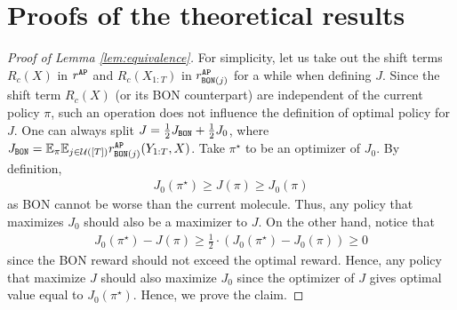 \section{Proofs of the theoretical results}\label{app:theory_proof}
\begin{proof}[Proof of Lemma \ref{lem:equivalence}]\label{app:lem:equivalence}
    For simplicity, let us take out the shift terms $R_c(X)$ in $r^{\mathtt{AP}}$ and $R_c(X_{1:T})$ in $r^{\mathtt{AP}}_{{\mathtt{BON}}(j)}$ for a while when defining $J$. 
    Since the shift term $R_c(X)$ (or its BON counterpart) are  independent of the current policy $\pi$, such an operation does not influence the definition of optimal policy for $J$.
    One can always split $J=\frac 1 2 J_{{\mathtt{BON}}} + \frac 1 2 J_0$, where 
    $J_{{\mathtt{BON}}} = \mathbb{E}_\pi \mathbb{E}_{j\in \mathcal{U}([T])} r_{{\mathtt{BON}}(j)}^{\mathtt{AP}}(Y_{1:T}, X)$. 
    Take $\pi^\star$ to be an optimizer of $J_0$. By definition, 
    \begin{align*}
        J_0(\pi^\star) \ge J(\pi) \ge J_0(\pi)
    \end{align*}
    as BON cannot be worse than the current molecule. 
    Thus, any policy that maximizes $J_0$ should also be a maximizer to $J$. 
    On the other hand, notice that 
    \begin{align}
        J_0(\pi^\star) - J(\pi) \ge \frac 1 2 \cdot (J_0(\pi^\star) - J_0(\pi)) \ge 0
    \end{align}
    since the BON reward should not exceed the optimal reward.
    Hence, any policy that maximize $J$ should also maximize $J_0$ since the optimizer of $J$ gives optimal value equal to $J_0(\pi^\star)$. 
    Hence, we prove the claim.
\end{proof}

